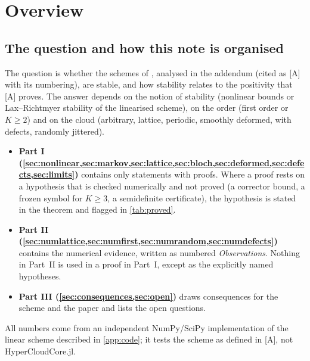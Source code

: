 \documentclass[11pt,a4paper]{article}
\theoremstyle{plain}
\theoremstyle{definition}
\theoremstyle{remark}
\numberwithin{equation}{section}
\begin{document}
\begin{abstract}
\emph{Measured only.} Spectra, Kreiss constants and Bloch symbols on jittered clouds show no visible growth in the settings of the paper (jitter $0.2h$), with Kreiss constants $1.002$--$1.33$, except an extremely weak Bloch instability ($\alpha h\le10^{-9}$) of one periodic pattern at $K=2$; weak instabilities ($\alpha h\approx2\cdot10^{-6}$) for $K=2$ and failures for $K=4$ when the stencil topology varies (jitter $0.4h$); order three is stable in every setting tested. On lattices, orders three to five are stable except order four with the geometric orientation in two dimensions. The first-order scheme advects $0.1$--$0.45\%$ too slowly on perturbed clouds, and a moment correction of the dissipation removes this. Stability of the high-order schemes on random clouds remains unproved.
\end{abstract}

\tableofcontents

\section{Overview}\label{sec:overview}

\subsection{The question and how this note is organised}

The question is whether the schemes of \cite{JungMUSCL2026}, analysed in the addendum \cite{Addendum} (cited as [A] with its numbering), are stable, and how stability relates to the positivity that [A] proves. The answer depends on the notion of stability (nonlinear bounds or Lax--Richtmyer stability of the linearised scheme), on the order (first order or $K\ge2$) and on the cloud (arbitrary, lattice, periodic, smoothly deformed, with defects, randomly jittered).

\begin{itemize}
\item \textbf{Part I (\cref{sec:nonlinear,sec:markov,sec:lattice,sec:bloch,sec:deformed,sec:defects,sec:limits})} contains only statements with proofs. Where a proof rests on a hypothesis that is checked numerically and not proved (a corrector bound, a frozen symbol for $K\ge3$, a semidefinite certificate), the hypothesis is stated in the theorem and flagged in \cref{tab:proved}.
\item \textbf{Part II (\cref{sec:numlattice,sec:numfirst,sec:numrandom,sec:numdefects})} contains the numerical evidence, written as numbered \emph{Observations}. Nothing in Part~II is used in a proof in Part~I, except as the explicitly named hypotheses.
\item \textbf{Part III (\cref{sec:consequences,sec:open})} draws consequences for the scheme and the paper and lists the open questions.
\end{itemize}
All numbers come from an independent NumPy/SciPy implementation of the linear scheme described in \cref{app:code}; it tests the scheme as defined in [A], not HyperCloudCore.jl.
\end{document}
